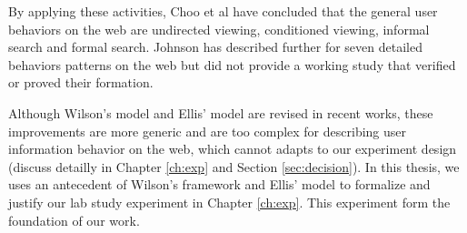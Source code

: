 By applying these activities, Choo et al have concluded that the general user behaviors 
on the web are undirected viewing, conditioned viewing, informal search and formal search.
Johnson has described further \cite{johnson2017patterns} for seven detailed behaviors 
patterns on the web but did not provide a working study that verified or proved their formation.

Although Wilson's model and Ellis' model are revised in recent works, these improvements
are more generic and are too complex for describing user information behavior on the web,
which cannot adapts to our experiment design (discuss detailly in Chapter \ref{ch:exp}
and Section \ref{sec:decision}).
In this thesis, we uses an antecedent of Wilson's framework \cite{wilson1997information} and 
Ellis' model \cite{ellis1997modelling} to formalize and justify our lab study experiment 
in Chapter \ref{ch:exp}. This experiment form the foundation of our work.

\cleardoublepage